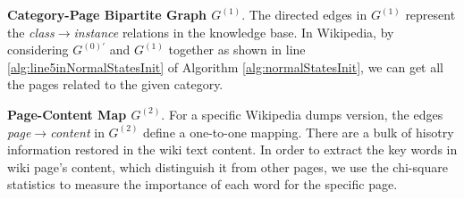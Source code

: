 \documentclass{article}
\begin{document}
\textbf{Category-Page Bipartite Graph \(G^{(1)}\)}. 
The directed edges in \(G^{(1)}\) represent the \textit{class}\(\rightarrow\)\textit{instance} relations in the knowledge base.
In Wikipedia, by considering \(G^{(0)'}\) and \(G^{(1)}\) together as shown in line \ref{alg:line5inNormalStatesInit} of Algorithm \ref{alg:normalStatesInit}, we can get all the pages related to the given category. 

\textbf{Page-Content Map \(G^{(2)}\)}. 
For a specific Wikipedia dumps version, the edges \textit{page}\(\rightarrow\)\textit{content} in \(G^{(2)}\) define a one-to-one mapping.
There are a bulk of hisotry information restored in the wiki text content.
In order to extract the key words in wiki page's content, which distinguish it from other pages, we use the chi-square statistics\cite{yang1997comparative}\cite{liu2009imbalanced} to measure the importance of each word for the specific page.
\end{document}

